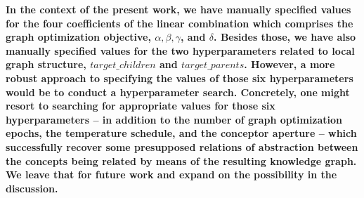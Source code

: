 \textbf{In the context of the present work, we have manually specified values for the four coefficients of the linear combination which comprises the graph optimization objective, $\alpha, \beta, \gamma$, and $\delta$. Besides those, we have also manually specified values for the two hyperparameters related to local graph structure, $target\_children$ and $target\_parents$. However, a more robust approach to specifying the values of those six hyperparameters would be to conduct a hyperparameter search. Concretely, one might resort to searching for appropriate values for those six hyperparameters -- in addition to the number of graph optimization epochs, the temperature schedule, and the conceptor aperture -- which successfully recover some presupposed relations of abstraction between the concepts being related by means of the resulting knowledge graph. We leave that for future work and expand on the possibility in the discussion.}